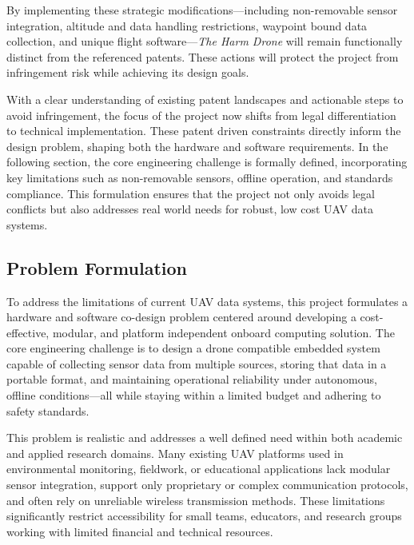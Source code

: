 \documentclass[12pt]{article}
\begin{document}
\par By implementing these strategic modifications—including non-removable sensor integration, altitude and data handling restrictions, waypoint bound data collection, and unique flight software—\textit{The Harm Drone} will remain functionally distinct from the referenced patents. These actions will protect the project from infringement risk while achieving its design goals.
\par With a clear understanding of existing patent landscapes and actionable steps to avoid infringement, the focus of the project now shifts from legal differentiation to technical implementation. These patent driven constraints directly inform the design problem, shaping both the hardware and software requirements. In the following section, the core engineering challenge is formally defined, incorporating key limitations such as non-removable sensors, offline operation, and standards compliance. This formulation ensures that the project not only avoids legal conflicts but also addresses real world needs for robust, low cost UAV data systems.

\subsection{Problem Formulation}

\par To address the limitations of current UAV data systems, this project formulates a hardware and software co-design problem centered around developing a cost-effective, modular, and platform independent onboard computing solution. The core engineering challenge is to design a drone compatible embedded system capable of collecting sensor data from multiple sources, storing that data in a portable format, and maintaining operational reliability under autonomous, offline conditions—all while staying within a limited budget and adhering to safety standards.

\par This problem is realistic and addresses a well defined need within both academic and applied research domains. Many existing UAV platforms used in environmental monitoring, fieldwork, or educational applications lack modular sensor integration, support only proprietary or complex communication protocols, and often rely on unreliable wireless transmission methods. These limitations significantly restrict accessibility for small teams, educators, and research groups working with limited financial and technical resources.
\end{document}
